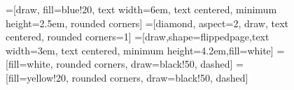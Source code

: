 \begin{figure}[H]


  \makeatletter

  =[draw, fill=blue!20, text width=6em, text centered, minimum height=2.5em, rounded corners]
  =[diamond, aspect=2, draw, text centered, rounded corners=1]
  =[draw,shape=flippedpage,text width=3em, text centered,
  minimum height=4.2em,fill=white]
  =[fill=white, rounded corners, draw=black!50, dashed]
  =[fill=yellow!20, rounded corners, draw=black!50, dashed]

  \begin{center}
\end{center}
\end{figure}
